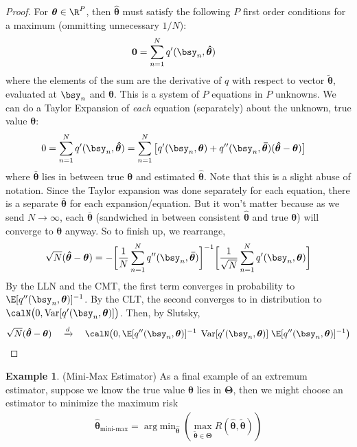 \documentclass[12pt]{article}
\theoremstyle{plain}
\theoremstyle{definition}
\newtheorem{ex}[thm]{Example}
\theoremstyle{remark}
\newcommand{\ra}{\rightarrow}
\newcommand{\bstheta}{\boldsymbol{\theta}}
\newcommand{\bsTheta}{\boldsymbol{\Theta}}
\newcommand{\bshattheta}{\boldsymbol{\hat{\theta}}}
\newcommand{\bsbartheta}{\boldsymbol{\bar{\theta}}}
\newcommand{\bstildetheta}{\boldsymbol{\tilde{\theta}}}
\renewcommand{\bso}{\boldsymbol{0}}
\DeclareMathOperator*{\argmin}{arg\;min}
\newcommand{\Var}{\operatorname{Var}}
\newcommand{\dto}{\xrightarrow{d}}
\newcommand{\sumnN}{\sum^N_{n=1}}
\begin{document}
\begin{proof}
For $\bstheta\in\R^P$, then $\bshattheta$ must satisfy the following
$P$ first order conditions for a maximum (ommitting unnecessary $1/N$):
\begin{align*}
  \bso &=
  \sumnN q'(\bsy_n,\bshattheta)
\end{align*}
where the elements of the sum are the derivative of $q$ with respect to
vector $\bstildetheta$, evaluated at $\bsy_n$ and $\bshattheta$. This is
a system of $P$ equations in $P$ unknowns.  We can do a Taylor Expansion
of \emph{each} equation (separately) about the unknown, true value
$\bstheta$:
\begin{align*}
  0 &=
  \sumnN q'(\bsy_n,\bshattheta)
  =
  \sumnN
  \big[
  q'(\bsy_n,\bstheta)
  +
  q''(\bsy_n,\bsbartheta)
  (\bshattheta-\bstheta)
  \big]
\end{align*}
where $\bsbartheta$ lies in between true $\bstheta$ and estimated
$\bshattheta$. Note that this is a slight abuse of notation. Since the
Taylor expansion was done separately for each equation, there is a
separate $\bsbartheta$ for each expansion/equation. But it won't matter
because as we send $N\ra\infty$, each $\bsbartheta$ (sandwiched
in between consistent $\bshattheta$ and true $\bstheta$) will converge
to $\bstheta$ anyway.
So to finish up, we rearrange,
\begin{align*}
  \sqrt{N}(\bshattheta-\bstheta)
  =
  -
  \bigg[
  \frac{1}{N}
  \sumnN
  q''(\bsy_n,\bsbartheta)
  \bigg]^{-1}
  \bigg[
  \frac{1}{\sqrt{N}}
  \sumnN
  q'(\bsy_n,\bstheta)
  \bigg]
\end{align*}
By the LLN and the CMT, the first term converges in probability to
$\E[q''(\bsy_n,\bstheta)]^{-1}$. By the CLT, the second converges to in
distribution to $\calN\big(0,\Var[q'(\bsy_n,\bstheta)]\big)$. Then, by
Slutsky,
\begin{align*}
  \sqrt{N}(\bshattheta-\bstheta)
  \quad\dto\quad
  \calN\big(0,
  \E[q''(\bsy_n,\bstheta)]^{-1}
  \;
  \Var[q'(\bsy_n,\bstheta)]
  \;
  \E[q''(\bsy_n,\bstheta)]^{-1}
  \big)
\end{align*}

\end{proof}


\begin{ex}(Mini-Max Estimator)
As a final example of an extremum estimator, suppose we know the true
value $\bstheta$ lies in $\bsTheta$, then we might choose an estimator
to minimize the maximum risk
\begin{align*}
  \bshattheta_{\text{mini-max}}
  =
  \argmin_{\bshattheta}
  \left(
  \max_{\bstildetheta \in \bsTheta}
  R(\bshattheta,\bstildetheta)
  \right)
\end{align*}
\end{ex}
\end{document}
